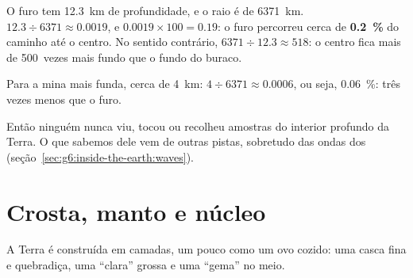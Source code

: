 \begin{example}\label{ex:g6:inside-the-earth:kola}
O furo tem 12.3~km de profundidade, e o raio é de 6371~km.
$12.3 \div 6371 \approx 0.0019$, e $0.0019 \times 100 = 0.19$: o furo
percorreu cerca de \textbf{0.2~\%} do caminho até o centro. No sentido
contrário, $6371 \div 12.3 \approx 518$: o centro fica mais de 500~vezes
mais fundo que o fundo do buraco.

Para a mina mais funda, cerca de 4~km: $4 \div 6371 \approx 0.0006$, ou
seja, 0.06~\%: três vezes menos que o furo.
\end{example}

Então ninguém nunca viu, tocou ou recolheu amostras do interior profundo
da Terra. O que sabemos dele vem de outras pistas, sobretudo das ondas dos
 (seção~\ref{sec:g6:inside-the-earth:waves}).

\section{Crosta, manto e núcleo}

A Terra é construída em camadas, um pouco como um ovo cozido: uma casca
fina e quebradiça, uma ``clara'' grossa e uma ``gema'' no meio.

